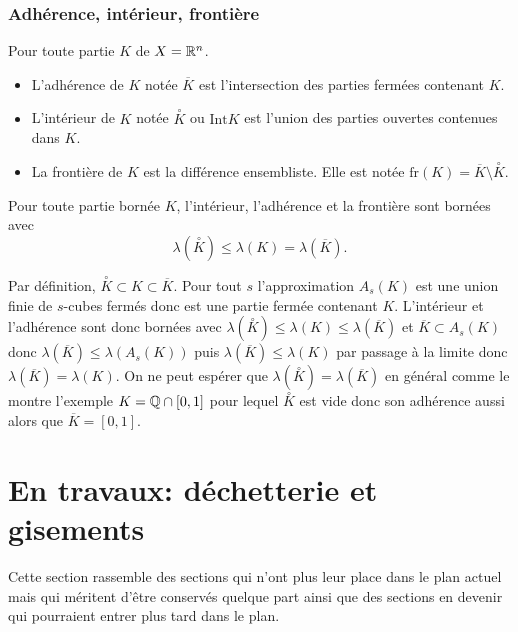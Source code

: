 \subsubsection{Adhérence, intérieur, frontière }
Pour toute partie $K$ de $X=\mathbb{R}^n$.
\begin{itemize}
 \item L'adhérence de $K$ notée $\overline{K}$ est l'intersection des parties fermées contenant $K$.
 \item L'intérieur de $K$ notée $\overset{\circ}{K}$ ou $\mathrm{Int}K $ est l'union des parties ouvertes contenues dans $K$.
 \item La frontière de $K$ est la différence ensembliste. Elle est notée $\mathrm{fr}(K) = \overline{K} \setminus \overset{\circ}{K}$.
\end{itemize}
\begin{propn}
 Pour toute partie bornée $K$, l'intérieur, l'adhérence et la frontière sont bornées avec
 \begin{displaymath}
  \lambda(\overset{\circ}{K}) \leq \lambda(K) = \lambda(\overline{K}).
 \end{displaymath}
\end{propn}
\begin{demo}
 Par définition, $\overset{\circ}{K} \subset K\subset \overline{K}$.\newline
 Pour tout $s$ l'approximation $A_s(K)$ est une union finie de $s$-cubes fermés donc est une partie fermée contenant $K$. L'intérieur et l'adhérence sont donc bornées avec $\lambda(\overset{\circ}{K})\leq \lambda(K) \leq \lambda(\overline{K})$ et $\overline{K} \subset A_s(K)$ donc $\lambda(\overline{K}) \leq \lambda(A_s(K))$ puis $\lambda(\overline{K}) \leq \lambda(K)$ par passage à la limite donc $\lambda(\overline{K}) = \lambda(K)$. \newline
 On ne peut espérer que $\lambda(\overset{\circ}{K}) = \lambda(\overline{K})$ en général comme le montre l'exemple $K= \mathbb{Q} \cap [0,1]$ pour lequel $\overset{\circ}{K}$ est vide donc son adhérence aussi alors que $\overline{K}=[0,1]$.
 \end{demo}


\section{En travaux: déchetterie et gisements}
Cette section rassemble des sections qui n'ont plus leur place dans le plan actuel mais qui méritent d'être conservés quelque part ainsi que des sections en devenir qui pourraient entrer plus tard dans le plan.

